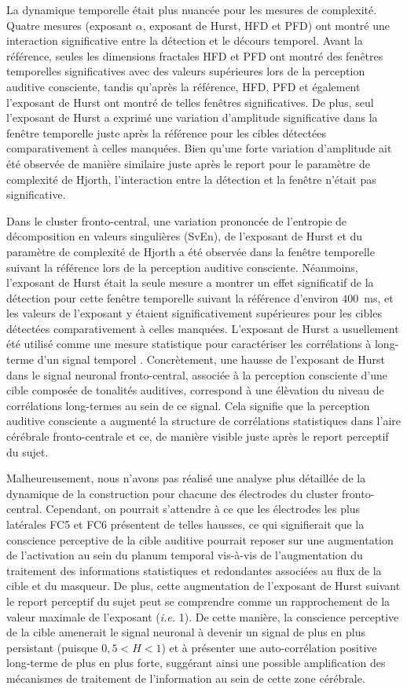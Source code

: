La dynamique temporelle était plus nuancée pour les mesures de complexité. 
Quatre mesures (exposant $\alpha$, exposant de Hurst, HFD et PFD) ont montré une interaction significative entre la détection et le décours temporel. 
Avant la référence, seules les dimensions fractales HFD et PFD ont montré des fenêtres temporelles significatives avec des valeurs supérieures lors de la perception auditive consciente, tandis qu'après la référence, HFD, PFD et également l'exposant de Hurst ont montré de telles fenêtres significatives. 
De plus, seul l'exposant de Hurst a exprimé une variation d'amplitude significative dans la fenêtre temporelle juste après la référence pour les cibles détectées comparativement à celles manquées.
Bien qu'une forte variation d'amplitude ait été observée de manière similaire juste après le report pour le paramètre de complexité de Hjorth, l'interaction entre la détection et la fenêtre n'était pas significative. 

Dans le cluster fronto-central, une variation prononcée de l'entropie de décomposition en valeurs singulières (SvEn), de l'exposant de Hurst et du paramètre de complexité de Hjorth a été observée dans la fenêtre temporelle suivant la référence lors de la perception auditive consciente. 
Néanmoins, l'exposant de Hurst était la seule mesure a montrer un effet significatif de la détection pour cette fenêtre temporelle suivant la référence d'environ $400$~ms, et les valeurs de l'exposant y étaient significativement supérieures pour les cibles détectées comparativement à celles manquées. 
L'exposant de Hurst a usuellement été utilisé comme une mesure statistique pour caractériser les corrélations à long-terme d'un signal temporel \citep{hurst1951long}. 
Concrètement, une hausse de l'exposant de Hurst dans le signal neuronal fronto-central, associée à la perception consciente d'une cible composée de tonalités auditives, correspond à une élèvation du niveau de corrélations long-termes au sein de ce signal. 
Cela signifie que la perception auditive consciente a augmenté la structure de corrélations statistiques dans l'aire cérébrale fronto-centrale et ce, de manière visible juste après le report perceptif du sujet. 

Malheureusement, nous n'avons pas réalisé une analyse plus détaillée de la dynamique de la construction pour chacune des électrodes du cluster fronto-central. 
Cependant, on pourrait s'attendre à ce que les électrodes les plus latérales FC5 et FC6 présentent de telles hausses, ce qui signifierait que la conscience perceptive de la cible auditive pourrait reposer sur une augmentation de l'activation au sein du planum temporal vis-à-vis de l'augmentation du traitement des informations statistiques et redondantes associées au flux de la cible et du masqueur. 
De plus, cette augmentation de l'exposant de Hurst suivant le report perceptif du sujet peut se comprendre comme un rapprochement de la valeur maximale de l'exposant (\textit{i.e.} 1).
De cette manière, la conscience perceptive de la cible amenerait le signal neuronal à devenir un signal de plus en plus persistant (puisque $0,5<H<1$) et à présenter une auto-corrélation positive long-terme de plus en plus forte, suggérant ainsi une possible amplification des mécanismes de traitement de l'information au sein de cette zone cérébrale. 


